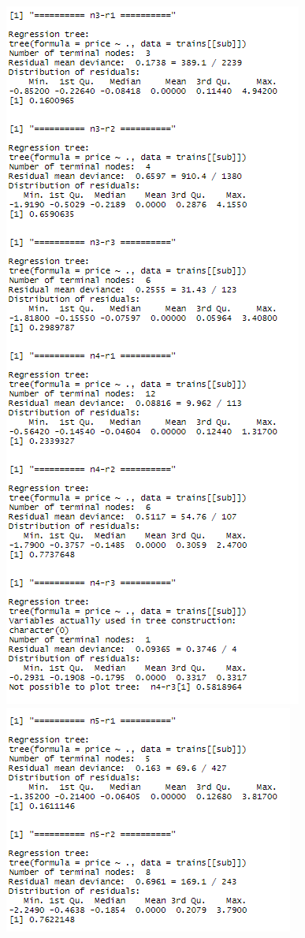 \documentclass{FR16}
\begin{document}
\begin{figure}[!htb]
   \begin{minipage}{0.48\textwidth}
     \centering
     \includegraphics[width=.7\linewidth]{figures/dt3.PNG}
   \end{minipage}
   
    \begin{minipage}{0.48\textwidth}
     \centering
     \includegraphics[width=.7\linewidth]{figures/dt4.1.PNG}
   \end{minipage}
   

\end{figure}
\end{document}
